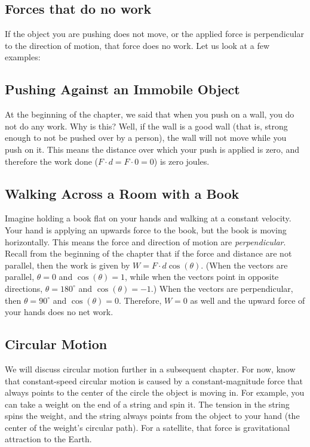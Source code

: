 \subsection{Forces that do no work}
If the object you are pushing does not move, or the applied force is perpendicular 
to the direction of motion, that force does no work. Let us look at a few examples:

\subsection{Pushing Against an Immobile Object}
At the beginning of the chapter, we said that when you push on a wall, you do not 
do any work. Why is this? Well, if the wall is a good wall (that is, strong 
enough to not be pushed over by a person), the wall will not move while you push on 
it. This means the distance over which your push is applied is zero, and 
therefore the work done ($F \cdot d = F \cdot 0 = 0$) is zero joules.

\subsection{Walking Across a Room with a Book}
Imagine holding a book flat on your hands and walking at a constant velocity. 
Your hand is applying an upwards force to the book, but the book is moving 
horizontally. This means the force and direction of motion are 
\textit{perpendicular}. Recall from the beginning of the chapter that if the 
force and distance are not parallel, then the work is given by $W = F \cdot d 
\cos{\left( \theta \right)}$. (When the vectors are parallel, $\theta = 0$ and 
$\cos{\left( \theta \right)} = 1$, while when the vectors point in opposite 
directions, $\theta = 180^{\circ}$ and $\cos{ \left( \theta \right)} = -1$.) 
When the vectors are perpendicular, then $\theta = 90^{\circ}$ and $\cos{ \left( 
\theta \right)} = 0$. Therefore, $W = 0$ as well and the upward force of your 
hands does no net work. 

\subsection{Circular Motion}
We will discuss circular motion further in a subsequent chapter. For now, know 
that constant-speed circular motion is caused by a constant-magnitude force that 
always points to the center of the circle the object is moving in. For example, 
you can take a weight on the end of a string and spin it. The tension in the 
string spins the weight, and the string always points from the object to your 
hand (the center of the weight's circular path). For a satellite, that force is 
gravitational attraction to the Earth.

